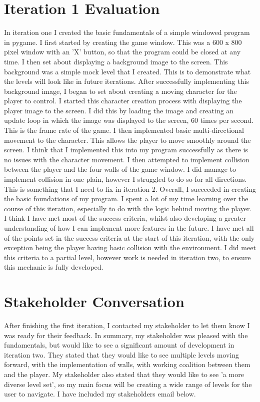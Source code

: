 \documentclass[12pt]{report}
\begin{document}
\section{Iteration 1 Evaluation}
In iteration one I created the basic fundamentals of a simple windowed program in pygame. I first started by creating the game window. This was a 600 x 800 pixel window with an 'X' button, so that the program could be closed at any time. I then set about displaying a background image to the screen. This background was a simple mock level that I created. This is to demonstrate what the levels will look like in future iterations. After successfully implementing this background image, I began to set about creating a moving character for the player to control. 
\newline
\newline
I started this character creation process with displaying the player image to the screen. I did this by loading the image and creating an update loop in which the image was displayed to the screen, 60 times per second. This is the frame rate of the game. I then implemented basic multi-directional movement to the character. This allows the player to move smoothly around the screen. I think that I implemented this into my program successfully as there is no issues with the character movement.
\newline
\newline
I then attempted to implement collision between the player and the four walls of the game window. I did manage to implement collision in one plain, however I struggled to do so for all directions. This is something that I need to fix in iteration 2.
\newline
\newline
Overall, I succeeded in creating the basic foundations of my program. I spent a lot of my time learning over the course of this iteration, especially to do with the logic behind moving the player. I think I have met most of the success criteria, whilst also developing a greater understanding of how I can implement more features in the future. I have met all of the points set in the success criteria at the start of this iteration, with the only exception being the player having basic collision with the environment. I did meet this criteria to a partial level, however work is needed in iteration two, to ensure this mechanic is fully developed.  

\pagebreak

\section{Stakeholder Conversation}
After finishing the first iteration, I contacted my stakeholder to let them know I was ready for their feedback. In summary, my stakeholder was pleased with the fundamentals, but would like to see a significant amount of development in iteration two. They stated that they would like to see multiple levels moving forward, with the implementation of walls, with working coalition between them and the player. My stakeholder also stated that they would like to see 'a more diverse level set', so my main focus will be creating a wide range of levels for the user to navigate. I have included my stakeholders email below. 
\end{document}
